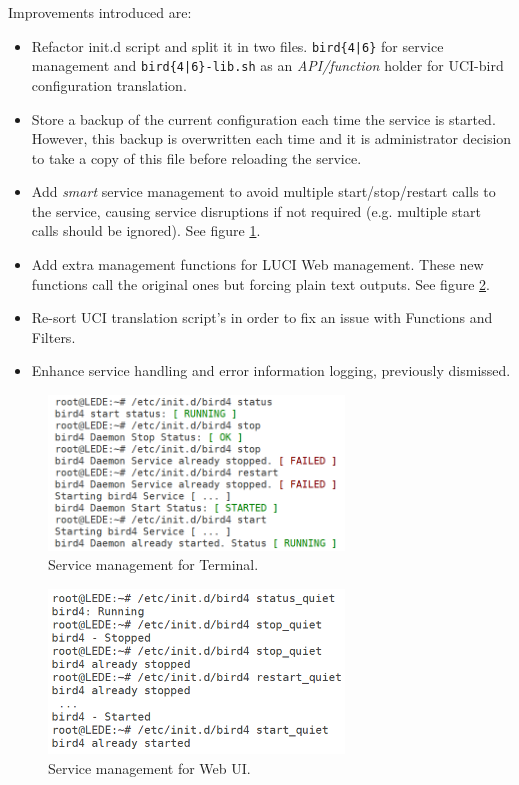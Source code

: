 Improvements introduced are:
\begin{itemize}
    \item Refactor init.d script and split it in two files. \texttt{bird\{4|6\}} for service management and \texttt{bird\{4|6\}-lib.sh} as an \textit{API/function} holder for UCI-bird configuration translation.
    \item Store a backup of the current configuration each time the service is started. However, this backup is overwritten each time and it is administrator decision to take a copy of this file before reloading the service.
    \item Add \textit{smart} service management to avoid multiple start/stop/restart calls to the service, causing service disruptions if not required (e.g. multiple start calls should be ignored). See figure \ref{fig:initdt}.
    \item Add extra management functions for LUCI Web management. These new functions call the original ones but forcing plain text outputs. See figure \ref{fig:initdui}.
    \item Re-sort UCI translation script's in order to fix an issue with Functions and Filters.
    \item Enhance service handling and error information logging, previously dismissed.
\end{itemize}

\begin{figure}[ht!]
    \centering
    \includegraphics[width=0.7\textwidth]{images/initdterminal}
    \caption{Service management for Terminal.}
    \label{fig:initdt}
\end{figure}

\begin{figure}[ht!]
    \centering
    \includegraphics[width=0.7\textwidth]{images/initdui}
    \caption{Service management for Web UI.}
    \label{fig:initdui}
\end{figure}

